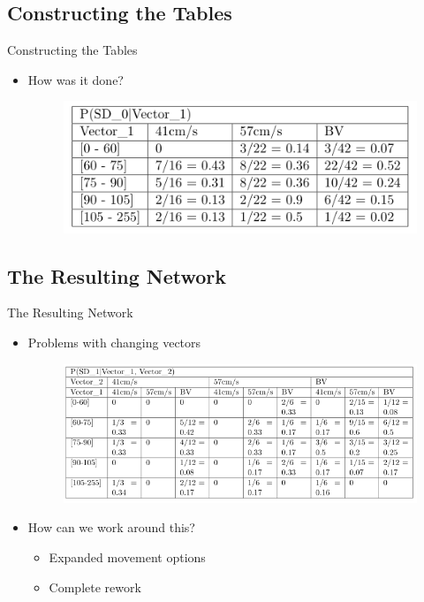 \subsection{Constructing the Tables}
\begin{frame}{Constructing the Tables}
\begin{itemize}
\item How was it done? 
\begin{figure}
  \includegraphics[scale=0.6]{figures/SD0GivenV1.PNG}
\end{figure}

\end{itemize}
\end{frame}


\subsection{The Resulting Network}
\begin{frame}{The Resulting Network}
\begin{itemize}
\item Problems with changing vectors
\begin{figure}
  \includegraphics[scale=0.4]{figures/SD1GivenV1V2.PNG}
\end{figure}
\item How can we work around this?
\begin{itemize}
  \item Expanded movement options
  \item Complete rework
  \end{itemize}
\end{itemize}
\end{frame}


